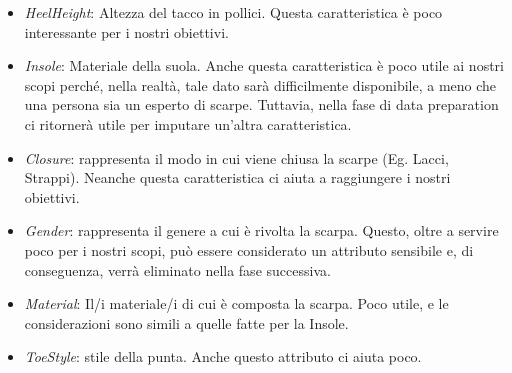 \documentclass[a4paper, 11pt, oneside]{report}
\begin{document}
\begin{itemize}
\begin{center}
                    \end{center}
                    \item \textit{HeelHeight}: Altezza del tacco in pollici.
                    Questa caratteristica è poco interessante per i nostri obiettivi.
                    \item \textit{Insole}: Materiale della suola.
                    Anche questa caratteristica è poco utile ai nostri scopi perché, nella realtà, tale dato sarà
                    difficilmente disponibile, a meno che una persona sia un esperto di scarpe.
                    Tuttavia, nella fase di data preparation ci ritornerà utile per imputare un'altra caratteristica.
                    \item \textit{Closure}: rappresenta il modo in cui viene chiusa la scarpe (Eg. Lacci, Strappi).
                    Neanche questa caratteristica ci aiuta a raggiungere i nostri obiettivi.
                    \item \textit{Gender}: rappresenta il genere a cui è rivolta la scarpa.
                    Questo, oltre a servire poco per i nostri scopi, può essere considerato un attributo sensibile e,
                    di conseguenza, verrà eliminato nella fase successiva.
                    \item \textit{Material}: Il/i materiale/i di cui è composta la scarpa.
                    Poco utile, e le considerazioni sono simili a quelle fatte per la Insole.
                    \item \textit{ToeStyle}: stile della punta.
                    Anche questo attributo ci aiuta poco.
                \end{itemize}
                \newpage
\end{document}
